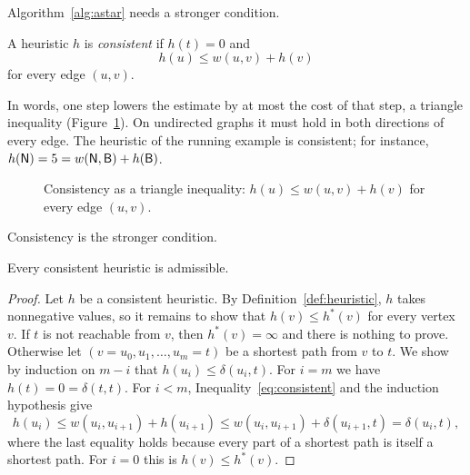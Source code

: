 Algorithm~\ref{alg:astar} needs a stronger condition.

\begin{definition}\label{def:consistent}
A heuristic $h$ is \emph{consistent} if $h(t) = 0$ and
\begin{equation}\label{eq:consistent}
  h(u) \le w(u,v) + h(v)
\end{equation}
for every edge $(u,v)$.
\end{definition}

In words, one step lowers the estimate by at most the cost of that step, a
triangle inequality (Figure~\ref{fig:consistency}). On undirected graphs it must
hold in both directions of every edge. The heuristic of the running example is
consistent; for instance, $h(\textsf{N}) = 5 = w(\textsf{N}, \textsf{B}) + h(\textsf{B})$.

\begin{figure}[htbp]
  \centering
  \caption{Consistency as a triangle inequality: $h(u) \le w(u,v) + h(v)$ for
    every edge $(u,v)$.}\label{fig:consistency}
\end{figure}

Consistency is the stronger condition.

\begin{lemma}\label{lem:cons-adm}
Every consistent heuristic is admissible.
\end{lemma}

\begin{proof}
Let $h$ be a consistent heuristic. By Definition~\ref{def:heuristic}, $h$
takes nonnegative values, so it remains to show that $h(v) \le h^{*}(v)$ for
every vertex $v$. If $t$ is not reachable from $v$, then $h^{*}(v) = \infty$
and there is nothing to prove. Otherwise let $(v = u_0, u_1, \dots, u_m = t)$ be a shortest path from
$v$ to $t$. We show by induction on $m - i$ that
$h(u_i) \le \delta(u_i, t)$. For $i = m$ we have $h(t) = 0 = \delta(t,t)$. For
$i < m$, Inequality~\eqref{eq:consistent} and the induction hypothesis give
\[
  h(u_i) \le w(u_i, u_{i+1}) + h(u_{i+1})
         \le w(u_i, u_{i+1}) + \delta(u_{i+1}, t) = \delta(u_i, t),
\]
where the last equality holds because every part of a shortest path is itself a
shortest path. For $i = 0$ this is $h(v) \le h^{*}(v)$.
\end{proof}

